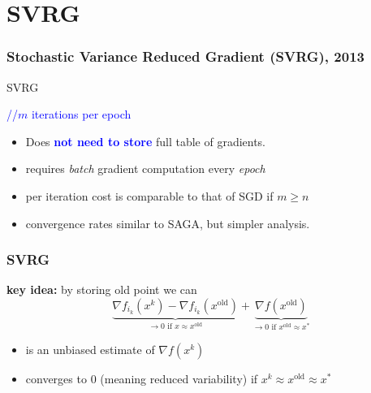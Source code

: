 \documentclass[aspectratio=149]{beamer}
\begin{document}
\section{SVRG}%

\begin{frame}
  \frametitle{Stochastic Variance Reduced Gradient (SVRG), 2013}

  \begin{algorithm}[H]
    \caption{SVRG}\label{}
    \begin{algorithmic}[1]
      \hfill \textcolor{blue}{//$m$ iterations per epoch}
      \EndFor{}
      \EndFor{}
    \end{algorithmic}
  \end{algorithm}
  \begin{itemize}
    \item Does \textbf{\textcolor{blue}{not need to store}} full table of gradients.
    \item requires \emph{batch} gradient computation every \emph{epoch}
    \item per iteration cost is comparable to that of SGD if $m \ge n$
    \item convergence rates similar to SAGA, but simpler analysis.
  \end{itemize}
\end{frame}

\begin{frame}
  \frametitle{SVRG}
  \textbf{key idea:} by storing old point we can
  \begin{equation}
    \underbrace{\nabla f_{i_k}(x^k) - \nabla f_{i_k}(x^{\text{old}})}_{\text{$\to 0$ if $x\approx x^{\text{old}}$}} + \underbrace{\nabla f(x^{\text{old}})}_{\text{$\to 0$ if $x^{\text{old}}\approx x^*$}}
  \end{equation}
  \begin{itemize}
    \item is an unbiased estimate of $\nabla f(x^k)$
    \item converges to $0$ (meaning reduced variability) if $x^k\approx x^{\text{old}} \approx x^*$
  \end{itemize}

\end{frame}
\end{document}
